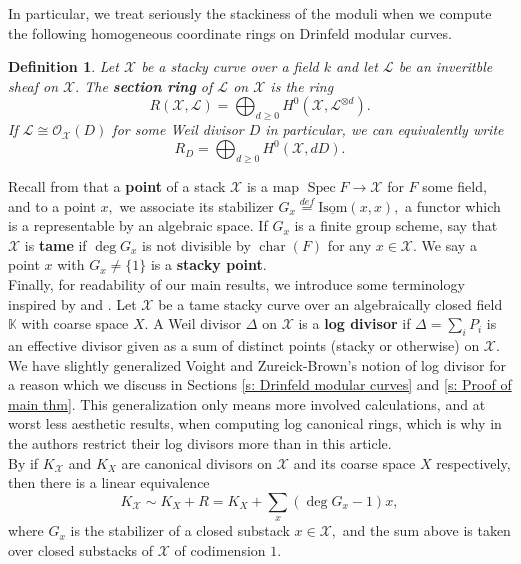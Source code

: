\documentclass[11pt]{amsart}
\newtheorem{definition}[theorem]{Definition}
\theoremstyle{definition}
\numberwithin{equation}{section}
\newcommand{\Isom}{\mathrm{Isom}} 	%
\newcommand{\Spec}{\operatorname{Spec}} 	%
\newcommand{\cO}{\mathcal{O}}		%
\newcommand{\sL}{\mathscr{L}}		%
\newcommand{\sX}{\mathscr{X}}		%
\newcommand{\bbK}{\mathbb{K}}		%
\begin{document}
		In particular, we treat seriously the stackiness of the moduli when we compute the following homogeneous coordinate rings on Drinfeld modular curves.  
		\begin{definition}
			Let $\sX$ be a stacky curve over a field $k$ and let $\sL$ be an inveritble sheaf on $\sX.$ The \textbf{section ring} of $\sL$ on $\sX$ is the ring 
			\[R(\sX,\sL)=\bigoplus_{d\geq 0}H^0(\sX,\sL^{\otimes d}).\]
			If $\sL\cong \cO_{\sX}(D)$ for some Weil divisor $D$ in particular, we can equivalently write 
			\[R_D=\bigoplus_{d\geq 0}H^0(\sX,dD).
			\]
		\end{definition}		
		
		Recall from \cite[Chapter $5.1$]{VZB} that a \textbf{point} of a stack $\sX$ is a map $\Spec F\to \sX$ for $F$ some field, and to a point $x,$ we associate its stabilizer $G_x\overset{def}{=}\underline{\Isom}(x,x),$ a functor which is a representable by an algebraic space. If $G_x$ is a finite group scheme, say that $\sX$ is \textbf{tame} if $\deg G_x$ is not divisible by $\operatorname{char}(F)$ for any $x\in \sX.$ We say a point $x$ with $G_x\neq \{1\}$ is a \textbf{stacky point}.\\
		
		Finally, for readability of our main results, we introduce some terminology inspired by \cite[Definition $5.6.2$]{VZB} and \cite[Proposition $5.5.6$]{VZB}. Let $\sX$ be a tame stacky curve over an algebraically closed field $\bbK$ with coarse space $X.$ A Weil divisor $\Delta$ on $\sX$ is a \textbf{log divisor} if $\Delta=\sum_i P_i$ is an effective divisor given as a sum of distinct points (stacky or otherwise) on $\sX.$ We have slightly generalized Voight and Zureick-Brown's notion of log divisor for a reason which we discuss in Sections \ref{s: Drinfeld modular curves} and \ref{s: Proof of main thm}. This generalization only means more involved calculations, and at worst less aesthetic results, when computing log canonical rings, which is why in \cite[Remark $5.4.6$]{VZB} the authors restrict their log divisors more than in this article.\\ 
		
		By \cite[Proposition $5.5.6$]{VZB} if $K_{\sX}$ and $K_X$ are canonical divisors on $\sX$ and its coarse space $X$ respectively, then there is a linear equivalence
		\[K_{\sX}\sim K_X+R=K_X+\sum_x \left(\deg G_x-1\right)x,\]
		where $G_x$ is the stabilizer of a closed substack $x\in \sX,$ and the sum above is taken over closed substacks of $\sX$ of codimension $1.$
\end{document}
